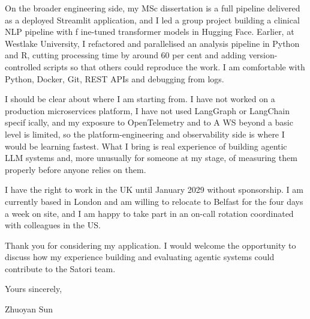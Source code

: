 \documentclass[letterpaper,11pt]{article}
\begin{document}
On the broader engineering side, my MSc dissertation is a full pipeline delivered as a deployed Streamlit application, and I led a group project building a clinical NLP pipeline with f\kern0pt ine-tuned transformer models in Hugging Face. Earlier, at Westlake University, I refactored and parallelised an analysis pipeline in Python and R, cutting processing time by around 60 per cent and adding version-controlled scripts so that others could reproduce the work. I am comfortable with Python, Docker, Git, REST APIs and debugging from logs.

I should be clear about where I am starting from. I have not worked on a production microservices platform, I have not used LangGraph or LangChain specif\kern0pt ically, and my exposure to OpenTelemetry and to A\kern0pt WS beyond a basic level is limited, so the platform-engineering and observability side is where I would be learning fastest. What I bring is real experience of building agentic LLM systems and, more unusually for someone at my stage, of measuring them properly before anyone relies on them.

I have the right to work in the UK until January 2029 without sponsorship. I am currently based in London and am willing to relocate to Belfast for the four days a week on site, and I am happy to take part in an on-call rotation coordinated with colleagues in the US.

Thank you for considering my application. I would welcome the opportunity to discuss how my experience building and evaluating agentic systems could contribute to the Satori team.

\vspace{2pt}
Yours sincerely,

\vspace{8pt}
Zhuoyan Sun
\end{document}
